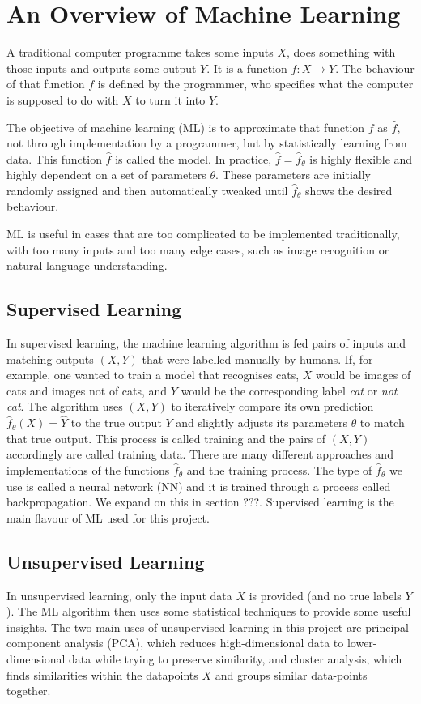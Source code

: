 \section{An Overview of Machine Learning \label{sec: ML}}
    A traditional computer programme takes some inputs $X$, does something with those inputs and outputs some output $Y$. It is a function $f: X \rightarrow Y$. The behaviour of that function $f$ is defined by the programmer, who specifies what the computer is supposed to do with $X$ to turn it into $Y$.
    
    The objective of machine learning (ML) is to approximate that function $f$ as $\hat{f}$, not through implementation by a programmer, but by statistically learning from data. This function $\hat{f}$ is called the model. In practice, $\hat{f} = \hat{f}_\theta$ is highly flexible and highly dependent on a set of parameters $\theta$. These parameters are initially randomly assigned and then automatically tweaked until $\hat{f}_\theta$ shows the desired behaviour.
    
    ML is useful in cases that are too complicated to be implemented traditionally, with too many inputs and too many edge cases, such as image recognition or natural language understanding.
    
    \subsection{Supervised Learning}
        In supervised learning, the machine learning algorithm is fed pairs of inputs and matching outputs $(X, Y)$ that were labelled manually by humans. If, for example, one wanted to train a model that recognises cats, $X$ would be images of cats and images not of cats, and $Y$ would be the corresponding label \textit{cat} or \textit{not cat}. The algorithm uses $(X, Y)$ to iteratively compare its own prediction $\hat{f}_\theta(X) = \hat{Y}$ to the true output $Y$ and slightly adjusts its parameters $\theta$ to match that true output. This process is called training and the pairs of $(X, Y)$ accordingly are called training data. There are many different approaches and implementations of the functions $\hat{f}_\theta$ and the training process. The type of $\hat{f}_\theta$ we use is called a neural network (NN) and it is trained through a process called backpropagation. We expand on this in section ???. Supervised learning is the main flavour of ML used for this project.
        
    \subsection{Unsupervised Learning}
        In unsupervised learning, only the input data $X$ is provided (and no true labels $Y$). The ML algorithm then uses some statistical techniques to provide some useful insights. The two main uses of unsupervised learning in this project are principal component analysis (PCA), which reduces high-dimensional data to lower-dimensional data while trying to preserve similarity, and cluster analysis, which finds similarities within the datapoints $X$ and groups similar data-points together.